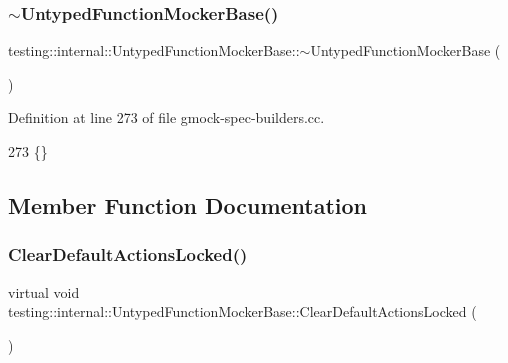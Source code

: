 \subsubsection{\texorpdfstring{$\sim$\+Untyped\+Function\+Mocker\+Base()}{~UntypedFunctionMockerBase()}}
{\footnotesize\ttfamily testing\+::internal\+::\+Untyped\+Function\+Mocker\+Base\+::$\sim$\+Untyped\+Function\+Mocker\+Base (\begin{DoxyParamCaption}{ }\end{DoxyParamCaption})\hspace{0.3cm}{\ttfamily [virtual]}}



Definition at line 273 of file gmock-\/spec-\/builders.\+cc.


\begin{DoxyCode}
273 \{\}
\end{DoxyCode}


\subsection{Member Function Documentation}
\mbox{\label{classtesting_1_1internal_1_1UntypedFunctionMockerBase_a40ddd95736946a7951033aa89a7b617f}} 
\subsubsection{\texorpdfstring{Clear\+Default\+Actions\+Locked()}{ClearDefaultActionsLocked()}}
{\footnotesize\ttfamily virtual void testing\+::internal\+::\+Untyped\+Function\+Mocker\+Base\+::\+Clear\+Default\+Actions\+Locked (\begin{DoxyParamCaption}{ }\end{DoxyParamCaption})\hspace{0.3cm}{\ttfamily [pure virtual]}}




